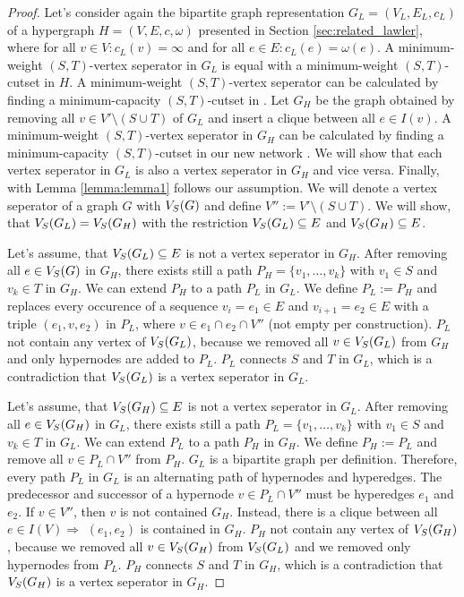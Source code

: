 \begin{proof}

Let's consider again the bipartite graph representation $G_L = (V_L,E_L,c_L)$ 
of a hypergraph $H = (V,E,c,\omega)$ presented in Section \ref{sec:related_lawler}, 
where for all $v \in V: c_L(v) = \infty$ and for all $e \in E: c_L(e) = 
\omega(e)$. A minimum-weight $(S,T)$-vertex seperator in $G_L$ is equal
with a minimum-weight $(S,T)$-cutset in $H$. A minimum-weight $(S,T)$-vertex seperator can be calculated
by finding a minimum-capacity $(S,T)$-cutset in . Let $G_H$ be the graph obtained by removing
all $v \in V'\setminus (S \cup T)$ of $G_L$ and insert a clique between all $e \in I(v)$. 
A minimum-weight $(S,T)$-vertex seperator in $G_H$ can be calculated by finding a 
minimum-capacity $(S,T)$-cutset in our new network .
We will show that each vertex seperator in $G_L$ is also a vertex seperator in $G_H$ and
vice versa. Finally, with Lemma \ref{lemma:lemma1} follows our assumption. We will 
denote a vertex seperator of a graph $G$ with $V_S(G)$ and define $V'' := V' \setminus (S \cup T)$. 
We will show, that $V_S(G_L) = V_S(G_H)$ with the restriction $V_S(G_L) \subseteq E$ and
$V_S(G_H) \subseteq E$.

Let's assume, that $V_S(G_L) \subseteq E$ is not a vertex seperator in $G_H$. After removing all $e \in V_S(G)$ in
$G_H$, there exists still a path $P_H = \{v_1, \ldots, v_k\}$ with $v_1 \in S$ and
$v_k \in T$ in $G_H$. We can extend $P_H$ to a path $P_L$ in $G_L$.
We define $P_L := P_H$ and replaces every occurence of a sequence $v_i = e_1 \in E$ and
$v_{i+1} = e_2 \in E$ with a triple $(e_1,v,e_2)$ in $P_L$, where $v \in e_1 \cap e_2 \cap V''$
(not empty per construction). $P_L$ not contain any vertex of $V_S(G_L)$, because
we removed all $v \in V_S(G_L)$ from $G_H$ and only hypernodes are added to $P_L$. $P_L$ connects $S$ and 
$T$ in $G_L$, which is a contradiction that $V_S(G_L)$ is a vertex seperator in $G_L$.

Let's assume, that $V_S(G_H) \subseteq E$ is not a vertex seperator in $G_L$. After removing all $e \in V_S(G_H)$ in
$G_L$, there exists still a path $P_L = \{v_1, \ldots, v_k\}$ with $v_1 \in S$ and
$v_k \in T$ in $G_L$. We can extend $P_L$ to a path $P_H$ in $G_H$.
We define $P_H := P_L$ and remove all $v \in P_L \cap V''$ from $P_H$. $G_L$ is a bipartite
graph per definition. Therefore, every path $P_L$ in $G_L$ is an alternating path of hypernodes and
hyperedges. The predecessor and successor of a hypernode $v \in P_L \cap V''$ must be hyperedges
$e_1$ and $e_2$. If $v \in V''$, then $v$ is not contained $G_H$. Instead, there is
a clique between all $e \in I(V) \Rightarrow$ $(e_1,e_2)$ is contained in $G_H$.
$P_H$ not contain any vertex of $V_S(G_H)$, because we removed all $v \in V_S(G_H)$ from $V_S(G_L)$ 
and we removed only hypernodes from $P_L$. $P_H$ connects $S$ and $T$ in $G_H$, which is a contradiction 
that $V_S(G_H)$ is a vertex seperator in $G_H$.


\end{proof}
